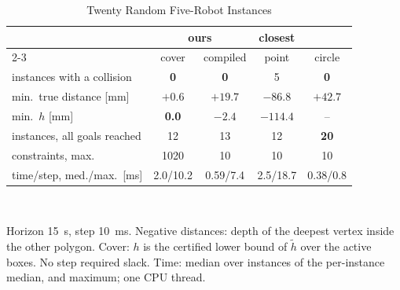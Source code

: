 \documentclass[journal]{IEEEtran}
\theoremstyle{definition}
\begin{document}
\begin{table}[t]
\caption{Twenty Random Five-Robot Instances}
\label{tab:stats}
\centering
\footnotesize
\setlength{\tabcolsep}{2pt}
\renewcommand{\arraystretch}{1.05}
\begin{tabular}{lcccc}
\toprule
& \multicolumn{2}{c}{ours} & closest & \\
\cmidrule(lr){2-3}
& cover & compiled & point & circle\\
\midrule
instances with a collision & \textbf{0} & \textbf{0} & 5 & \textbf{0}\\
min.\ true distance [mm] & $+0.6$ & $+19.7$ & $-86.8$ & $+42.7$\\
min.\ $h$ [mm] & \textbf{0.0} & $-2.4$ & $-114.4$ & --\\
instances, all goals reached & 12 & 13 & 12 & \textbf{20}\\
constraints, max. & 1020 & 10 & 10 & 10\\
time/step, med./max.\ [ms] & 2.0/10.2 & 0.59/7.4 & 2.5/18.7 & 0.38/0.8\\
\bottomrule
\end{tabular}
\\[3pt]
\parbox{\columnwidth}{\footnotesize Horizon 15~s, step 10~ms. Negative distances: depth of the
deepest vertex inside the other polygon. Cover: $h$ is the certified lower bound of $\tilde h$ over the
active boxes. No step required slack. Time: median over instances of the
per-instance median, and maximum; one CPU thread.}
\end{table}
\end{document}
